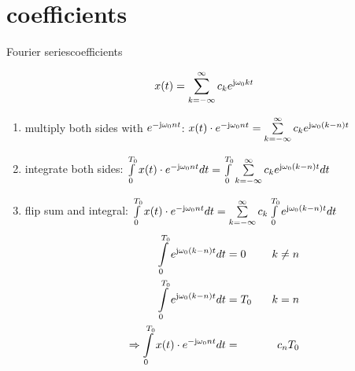     \section{coefficients}
        \begin{frame}{Fourier series}{coefficients}
            \vspace{-5mm}
            \begin{footnotesize}
            \begin{equation*}\nonumber
               x(t) = \sum\limits_{k=-\infty}^{\infty} c_k e^{\mathrm{j}\omega_0kt}
            \end{equation*}
            \begin{enumerate}
                \item   multiply both sides with $e^{-\mathrm{j}\omega_0nt}$: $x(t)\cdot e^{-\mathrm{j}\omega_0nt} = \sum\limits_{k=-\infty}^{\infty} c_k e^{\mathrm{j}\omega_0(k-n)t}$
                \item   integrate both sides: $\int\limits_0^{T_0}{x(t)\cdot e^{-\mathrm{j}\omega_0nt}}dt = \int\limits_0^{T_0}\sum\limits_{k=-\infty}^{\infty} c_k e^{\mathrm{j}\omega_0(k-n)t}dt$
                \item   flip sum and integral: $ \int\limits_0^{T_0}{x(t)\cdot e^{-\mathrm{j}\omega_0nt}}dt = \sum\limits_{k=-\infty}^{\infty}c_k \int\limits_0^{T_0} e^{\mathrm{j}\omega_0(k-n)t}dt$
                \begin{eqnarray*}
                    \int\limits_0^{T_0} e^{\mathrm{j}\omega_0(k-n)t}dt &= 0 &\;\;\;k\neq n\nonumber\\
                    \int\limits_0^{T_0} e^{\mathrm{j}\omega_0(k-n)t}dt &= T_0 &\;\;\;k= n\nonumber\\
                    \Rightarrow \int\limits_0^{T_0}{x(t)\cdot e^{-\mathrm{j}\omega_0nt}}dt &=& c_n T_0
                \end{eqnarray*}
            \end{enumerate}
            \end{footnotesize}
        \end{frame}


